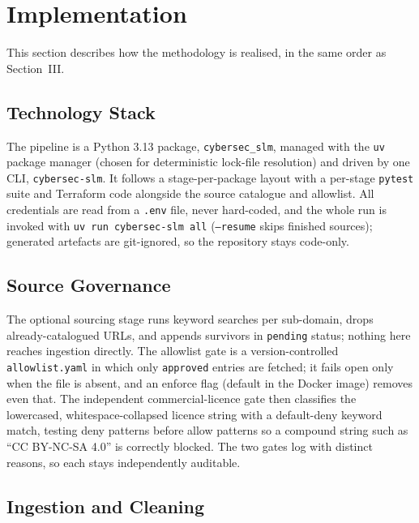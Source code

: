 \documentclass[conference]{IEEEtran}
\begin{document}
\section{Implementation}

This section describes how the methodology is realised, in the same
order as Section~III.

\subsection{Technology Stack}

The pipeline is a Python 3.13 package, \texttt{cybersec\_slm}, managed
with the \texttt{uv} package manager (chosen for deterministic lock-file
resolution) and driven by one CLI, \texttt{cybersec-slm}. It follows a
stage-per-package layout with a per-stage \texttt{pytest} suite and
Terraform code alongside the source catalogue and allowlist. All
credentials are read from a \texttt{.env} file, never hard-coded, and
the whole run is invoked with \texttt{uv run cybersec-slm all}
(\texttt{--resume} skips finished sources); generated artefacts are
git-ignored, so the repository stays code-only.

\subsection{Source Governance}

The optional sourcing stage runs keyword searches per sub-domain, drops
already-catalogued URLs, and appends survivors in \texttt{pending}
status; nothing here reaches ingestion directly. The allowlist gate is a
version-controlled \texttt{allowlist.yaml} in which only
\texttt{approved} entries are fetched; it fails open only when the file
is absent, and an enforce flag (default in the Docker image) removes
even that. The independent commercial-licence gate then classifies the
lowercased, whitespace-collapsed licence string with a default-deny
keyword match, testing deny patterns before allow patterns so a compound
string such as ``CC BY-NC-SA 4.0'' is correctly blocked. The two gates
log with distinct reasons, so each stays independently auditable.

\subsection{Ingestion and Cleaning}
\end{document}
